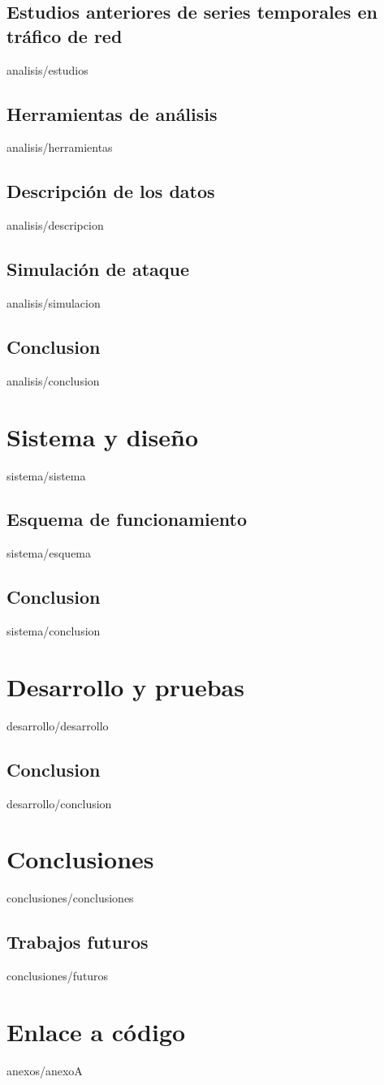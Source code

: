 \documentclass[epsbased,copyright,final,printable,covers,extendedindex,firstnumbered,tfg,gnuplot]{tfgtfmthesisuam}
\begin{document}
  \section{Estudios anteriores de series temporales en tráfico de red\label{SEC:ESTUDIOS}}{analisis/estudios}
  \section{Herramientas de análisis\label{SEC:HERRAMIENTAS}}{analisis/herramientas}
  \section{Descripción de los datos\label{SEC:DESCRIPCION}}{analisis/descripcion}
  \section{Simulación de ataque\label{SEC:SIMULACION}}{analisis/simulacion}
  \section{Conclusion\label{SEC:ADCONCLUSION}}{analisis/conclusion}

\chapter{Sistema y diseño\label{CAP:SISTEMA}}{sistema/sistema}
  \section{Esquema de funcionamiento\label{SEC:ESQUEMA}}{sistema/esquema}
  \section{Conclusion\label{SEC:SDCONCLUSION}}{sistema/conclusion}

\chapter{Desarrollo y pruebas\label{CAP:DESARROLLO}}{desarrollo/desarrollo}
  \section{Conclusion\label{SEC:DPCONCLUSION}}{desarrollo/conclusion}

\chapter{Conclusiones\label{CAP:CONCLUSIONES}}{conclusiones/conclusiones}
  \section{Trabajos futuros\label{SEC:FUTUROS}}{conclusiones/futuros}

\appendix

\chapter{Enlace a código\label{CAP:ACRONIMOS}}{anexos/anexoA}
\end{document}
